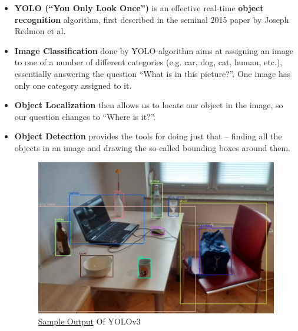 \documentclass[a4paper]{article}
\begin{document}
\begin{itemize}
    \item \textbf{YOLO (“You Only Look Once”)}\cite{redmon2016look}\cite{redmon2018yolov3} is an effective real-time \textbf{object recognition} algorithm, first described in the seminal 2015 paper by Joseph Redmon et al.
    \item \textbf{Image Classification} done by YOLO algorithm aims at assigning an image to one of a number of different categories (e.g. car, dog, cat, human, etc.), essentially answering the question “What is in this picture?”. One image has only one category assigned to it.
    \item \textbf{Object Localization} then allows us to locate our object in the image, so our question changes to “Where is it?”.
    \item \textbf{Object Detection} provides the tools for doing just that –  finding all the objects in an image and drawing the so-called bounding boxes around them.
    \begin{figure}[h!]
        \centering
        \includegraphics[width=0.9\linewidth]{Pictures/Detected-with-YOLO--Schreibtisch-mit-Objekten.jpg}
        \caption{\href{https://en.wikipedia.org/wiki/Object_detection}{Sample Output}  Of YOLOv3}
        \label{fig:YOLOv3Sample}
    \end{figure}
\end{itemize}
\end{document}
